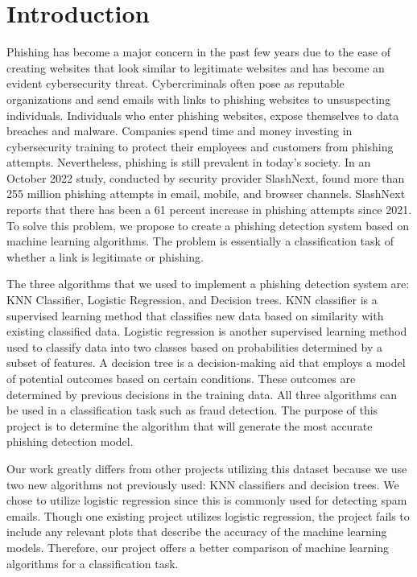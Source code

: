 \documentclass[conference]{IEEEtran}
\begin{document}
\section{Introduction}
Phishing has become a major concern in the past few years due to the ease of creating websites that look similar to legitimate websites and has become an evident cybersecurity threat. Cybercriminals often pose as reputable organizations and send emails with links to phishing websites to unsuspecting individuals. Individuals who enter phishing websites, expose themselves to data breaches and malware. Companies spend time and money investing in cybersecurity training to protect their employees and customers from phishing attempts. Nevertheless, phishing is still prevalent in today’s society. In an October 2022 study, conducted by security provider SlashNext, found more than 255 million phishing attempts in email, mobile, and browser channels. SlashNext reports that there has been a 61 percent increase in phishing attempts since 2021. To solve this problem, we propose to create a phishing detection system based on machine learning algorithms. The problem is essentially a classification task of whether a link is legitimate or phishing.  

The three algorithms that we used to implement a phishing detection system are: KNN Classifier, Logistic Regression, and Decision trees. KNN classifier is a supervised learning method that classifies new data based on similarity with existing classified data.  Logistic regression is another supervised learning method used to classify data into two classes based on probabilities determined by a subset of features. A decision tree is a decision-making aid that employs a model of potential outcomes based on certain conditions. These outcomes are determined by previous decisions in the training data. All three algorithms can be used in a classification task such as fraud detection. The purpose of this project is to determine the algorithm that will generate the most accurate phishing detection model. 

Our work greatly differs from other projects utilizing this dataset because we use two new algorithms not previously used: KNN classifiers and decision trees. We chose to utilize logistic regression since this is commonly used for detecting spam emails. Though one existing project utilizes logistic regression, the project fails to include any relevant plots that describe the accuracy of the machine learning models. Therefore, our project offers a better comparison of machine learning algorithms for a classification task. 
\end{document}
